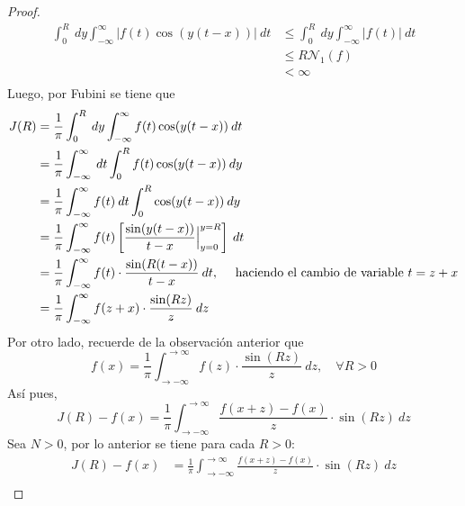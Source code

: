 \documentclass[12pt]{report}
\theoremstyle{largebreak}
\renewcommand{\leq}{\ensuremath{\leqslant}}
\newcommand\abs[1]{\ensuremath{\left|#1\right|}}
\newcommand{\N}[2]{\ensuremath{\mathcal{N}_{#1}\left(#2\right)}}
\begin{document}
\begin{proof}
        \begin{equation*}
            \begin{split}
                \int_0^R\:dy\int_{-\infty}^\infty \abs{f(t)\cos(y(t-x))}\:dt&\leq\int_0^R\:dy\int_{-\infty}^\infty \abs{f(t)}\:dt\\
                &\leq R\N{1}{f}\\
                &<\infty\\
            \end{split}
        \end{equation*}
        Luego, por Fubini se tiene que
        \begin{equation*}
            \begin{split}
                J(R)&=\frac{1}{\pi}\int_0^R\:dy\int_{-\infty}^\infty f(t)\cos(y(t-x))\:dt\\
                &=\frac{1}{\pi}\int_{-\infty}^\infty\:dt\int_0^R f(t)\cos(y(t-x))\:dy\\
                &=\frac{1}{\pi}\int_{-\infty}^\infty f(t)\:dt\int_0^R \cos(y(t-x))\:dy\\
                &=\frac{1}{\pi}\int_{-\infty}^\infty f(t)\left[\frac{\sin(y(t-x))}{t-x}\Big|_{ y=0}^{ y=R} \right]\:dt\\
                &=\frac{1}{\pi}\int_{-\infty}^\infty f(t)\cdot\frac{\sin(R(t-x))}{t-x}\:dt,\quad\textup{ haciendo el cambio de variable }t=z+x \\
                &=\frac{1}{\pi}\int_{-\infty}^\infty f(z+x)\cdot\frac{\sin(Rz)}{z}\:dz\\
            \end{split}
        \end{equation*}
        Por otro lado, recuerde de la observación anterior que
        \begin{equation*}
            f(x)=\frac{1}{\pi}\int_{\rightarrow-\infty}^{\rightarrow\infty} f(z)\cdot\frac{\sin(Rz)}{z}\:dz,\quad\forall R>0
        \end{equation*}
        Así pues,
        \begin{equation*}
            J(R)-f(x)=\frac{1}{\pi}\int_{\rightarrow-\infty}^{\rightarrow\infty}\frac{f(x+z)-f(x)}{z}\cdot\sin(Rz)\:dz
        \end{equation*}
        Sea $N>0$, por lo anterior se tiene para cada $R>0$:
        \begin{equation*}
            \begin{split}
                J(R)-f(x)&=\frac{1}{\pi}\int_{\rightarrow-\infty}^{\rightarrow\infty}\frac{f(x+z)-f(x)}{z}\cdot\sin(Rz)\:dz\\

\end{split}
\end{equation*}
\end{proof}
\end{document}
